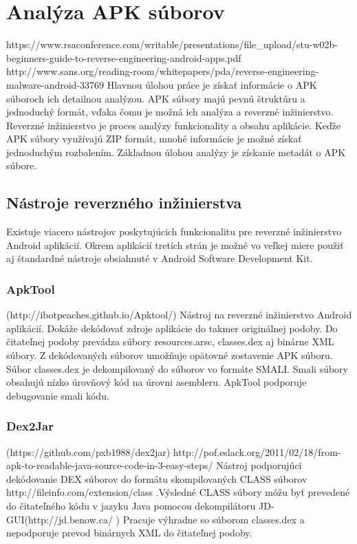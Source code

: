 \chapter{Analýza APK súborov}
\label{analyza}
https://www.rsaconference.com/writable/presentations/file\_upload/stu-w02b-beginners-guide-to-reverse-engineering-android-apps.pdf
http://www.sans.org/reading-room/whitepapers/pda/reverse-engineering-malware-android-33769
Hlavnou úlohou práce je získať informácie o APK súboroch ich detailnou analýzou. APK súbory majú pevnú štruktúru a jednoduchý formát, vďaka čomu je možná ich analýza a reverzné inžinierstvo. Reverzné inžinierstvo je proces analýzy funkcionality a obsahu aplikácie. Keďže APK súbory využívajú ZIP formát, mnohé informácie je možné získať jednoduchým rozbalením. Základnou úlohou analýzy je získanie metadát o APK súbore.

\section{Nástroje reverzného inžinierstva}
\label{nastroje_revezneho_inzinierstva}

Existuje viacero nástrojov poskytujúcich funkcionalitu pre reverzné inžinierstvo Android aplikácií. Okrem aplikácií tretích strán je možné vo veľkej miere použiť aj štandardné nástroje obsiahnuté v Android Software Development Kit.

\subsection{ApkTool}
\label{ApkTool}
 (http://ibotpeaches.github.io/Apktool/)
Nástroj na reverzné inžinierstvo Android aplikácií. Dokáže dekódovať zdroje aplikácie do takmer originálnej podoby. Do čitateľnej podoby prevádza súbory resources.arsc, classes.dex aj binárne XML súbory. Z dekódovaných súborov umožňuje opätovné zostavenie APK súboru. Súbor classes.dex je dekompilovaný do súborov vo formáte SMALI. Smali súbory obsahujú nízko úrovňový kód na úrovni asembleru. ApkTool podporuje debugovanie smali kódu.

\subsection{Dex2Jar}
\label{Dex2Jar}
(https://github.com/pxb1988/dex2jar) http://pof.eslack.org/2011/02/18/from-apk-to-readable-java-source-code-in-3-easy-steps/
Nástroj podporujúci dekódovanie DEX súborov do formátu skompilovaných CLASS súborov http://fileinfo.com/extension/class .Výsledné CLASS súbory môžu byť prevedené do čitateľného kódu v jazyku Java pomocou dekompilátoru JD-GUI(http://jd.benow.ca/ ) Pracuje výhradne so súborom classes.dex a nepodporuje prevod binárnych XML do čitateľnej podoby.

